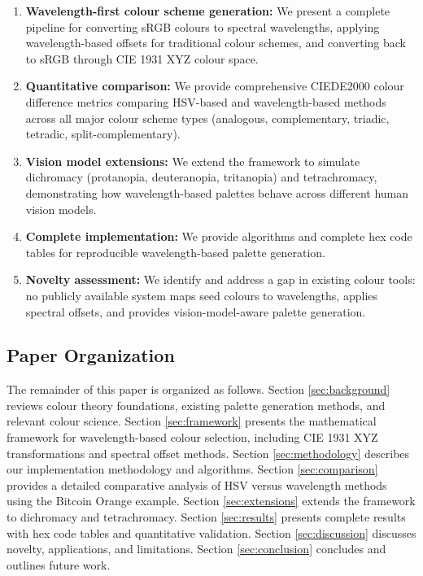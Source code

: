 \documentclass[12pt,a4paper]{article}
\begin{document}
\begin{enumerate}
\item \textbf{Wavelength-first colour scheme generation:} We present a complete pipeline for converting sRGB colours to spectral wavelengths, applying wavelength-based offsets for traditional colour schemes, and converting back to sRGB through CIE 1931 XYZ colour space.

\item \textbf{Quantitative comparison:} We provide comprehensive CIEDE2000 colour difference metrics comparing HSV-based and wavelength-based methods across all major colour scheme types (analogous, complementary, triadic, tetradic, split-complementary).

\item \textbf{Vision model extensions:} We extend the framework to simulate dichromacy (protanopia, deuteranopia, tritanopia) and tetrachromacy, demonstrating how wavelength-based palettes behave across different human vision models.

\item \textbf{Complete implementation:} We provide algorithms and complete hex code tables for reproducible wavelength-based palette generation.

\item \textbf{Novelty assessment:} We identify and address a gap in existing colour tools: no publicly available system maps seed colours to wavelengths, applies spectral offsets, and provides vision-model-aware palette generation.
\end{enumerate}

\subsection{Paper Organization}

The remainder of this paper is organized as follows. Section \ref{sec:background} reviews colour theory foundations, existing palette generation methods, and relevant colour science. Section \ref{sec:framework} presents the mathematical framework for wavelength-based colour selection, including CIE 1931 XYZ transformations and spectral offset methods. Section \ref{sec:methodology} describes our implementation methodology and algorithms. Section \ref{sec:comparison} provides a detailed comparative analysis of HSV versus wavelength methods using the Bitcoin Orange example. Section \ref{sec:extensions} extends the framework to dichromacy and tetrachromacy. Section \ref{sec:results} presents complete results with hex code tables and quantitative validation. Section \ref{sec:discussion} discusses novelty, applications, and limitations. Section \ref{sec:conclusion} concludes and outlines future work.
\end{document}
